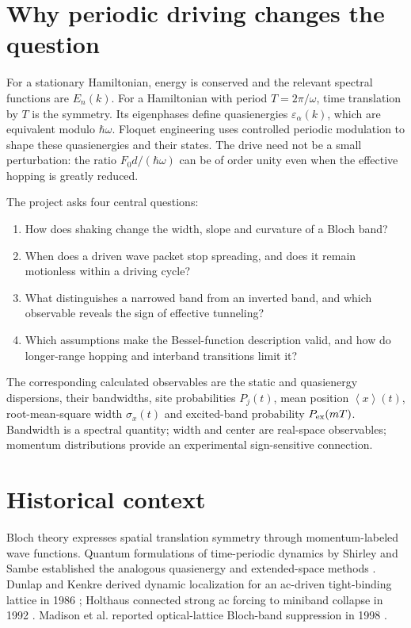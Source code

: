 \documentclass[11pt,oneside]{report}
\numberwithin{equation}{chapter}
\newcommand{\avg}[1]{\left\langle #1\right\rangle}
\begin{document}
\section{Why periodic driving changes the question}
For a stationary Hamiltonian, energy is conserved and the relevant spectral functions are $E_n(k)$. For a Hamiltonian with period $T=2\pi/\omega$, time translation by $T$ is the symmetry. Its eigenphases define quasienergies $\varepsilon_\alpha(k)$, which are equivalent modulo $\hbar\omega$. Floquet engineering uses controlled periodic modulation to shape these quasienergies and their states. The drive need not be a small perturbation: the ratio $F_0d/(\hbar\omega)$ can be of order unity even when the effective hopping is greatly reduced.

The project asks four central questions:
\begin{enumerate}
\item How does shaking change the width, slope and curvature of a Bloch band?
\item When does a driven wave packet stop spreading, and does it remain motionless within a driving cycle?
\item What distinguishes a narrowed band from an inverted band, and which observable reveals the sign of effective tunneling?
\item Which assumptions make the Bessel-function description valid, and how do longer-range hopping and interband transitions limit it?
\end{enumerate}
The corresponding calculated observables are the static and quasienergy dispersions, their bandwidths, site probabilities $P_j(t)$, mean position $\avg{x}(t)$, root-mean-square width $\sigma_x(t)$ and excited-band probability $P_{\rm ex}(mT)$. Bandwidth is a spectral quantity; width and center are real-space observables; momentum distributions provide an experimental sign-sensitive connection.

\section{Historical context}
Bloch theory expresses spatial translation symmetry through momentum-labeled wave functions. Quantum formulations of time-periodic dynamics by Shirley and Sambe established the analogous quasienergy and extended-space methods \cite{Shirley1965,Sambe1973}. Dunlap and Kenkre derived dynamic localization for an ac-driven tight-binding lattice in 1986 \cite{Dunlap1986}; Holthaus connected strong ac forcing to miniband collapse in 1992 \cite{Holthaus1992}. Madison et al. reported optical-lattice Bloch-band suppression in 1998 \cite{Madison1998}.
\end{document}
